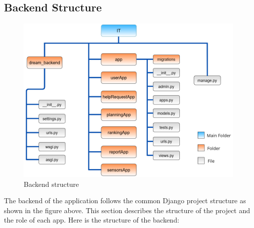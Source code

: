 \documentclass[table, 12pt]{article}
\begin{document}
\subsection{Backend Structure}
\begin{center}
    \begin{figure}[H]
        \includegraphics[scale=0.65, center]{assets/backend_structure.png}
        \caption{Backend structure}
        \label{fig: backend_structure}
    \end{figure}
\end{center}

The backend of the application follows the common Django project structure as shown in the figure above.
This section describes the structure of the project and the role of each app.\newline
Here is the structure of the backend:
\end{document}
